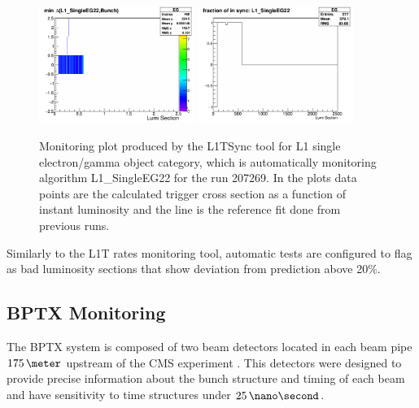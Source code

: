\begin{figure}[!htb]
\centering
\includegraphics[width=0.45\textwidth]{Chapter03/L1TOnline/Images/L1TDQM_Online_Run207269_L1TSync_AlgoVsBunchStructure_EG.png}
\includegraphics[width=0.45\textwidth]{Chapter03/L1TOnline/Images/L1TDQM_Online_Run207269_L1TSync_Certification_EG.png}
\caption{Monitoring plot produced by the L1TSync tool for L1 single electron/gamma object category, which is
automatically monitoring algorithm L1\_SingleEG22 for the run 207269. In the plots data points are the calculated
trigger cross section as a function of instant luminosity and the line is the reference fit done from previous runs.}
\label{FIGURE:TechnicalWork_SyncMonitoring}
\end{figure}

Similarly to the \gls{L1T} rates monitoring tool, automatic tests are configured to flag as bad luminosity sections that show deviation from prediction above 20\%. 

\subsection{BPTX Monitoring}


The \gls{BPTX} system is composed of two beam detectors located in each beam pipe $175\,\meter$ upstream of the \gls{CMS} experiment \cite{ARTICLE:TheCMSExperiment}. This detectors were designed to provide precise information about the bunch structure and timing of each beam and have sensitivity to time structures under $25\,\nano\second$. 

